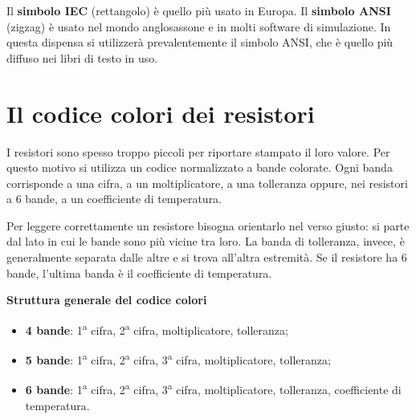 \begin{attenzione}
Il \textbf{simbolo IEC} (rettangolo) è quello più usato in Europa. Il \textbf{simbolo ANSI} (zigzag) è usato nel mondo anglosassone e in molti software di simulazione. In questa dispensa si utilizzerà prevalentemente il simbolo ANSI, che è quello più diffuso nei libri di testo in uso.
\end{attenzione}





\section{Il codice colori dei resistori}

I resistori sono spesso troppo piccoli per riportare stampato il loro valore. Per questo motivo si utilizza un codice normalizzato a bande colorate. Ogni banda corrisponde a una cifra, a un moltiplicatore, a una tolleranza oppure, nei resistori a 6 bande, a un coefficiente di temperatura.

Per leggere correttamente un resistore bisogna orientarlo nel verso giusto: si parte dal lato in cui le bande sono più vicine tra loro. La banda di tolleranza, invece, è generalmente separata dalle altre e si trova all'altra estremità. Se il resistore ha 6 bande, l'ultima banda è il coefficiente di temperatura.

\begin{concetto}
\textbf{Struttura generale del codice colori}

\begin{itemize}[leftmargin=1cm]
  \item \textbf{4 bande}: 1\textsuperscript{a} cifra, 2\textsuperscript{a} cifra, moltiplicatore, tolleranza;
  \item \textbf{5 bande}: 1\textsuperscript{a} cifra, 2\textsuperscript{a} cifra, 3\textsuperscript{a} cifra, moltiplicatore, tolleranza;
  \item \textbf{6 bande}: 1\textsuperscript{a} cifra, 2\textsuperscript{a} cifra, 3\textsuperscript{a} cifra, moltiplicatore, tolleranza, coefficiente di temperatura.
\end{itemize}
\end{concetto}

